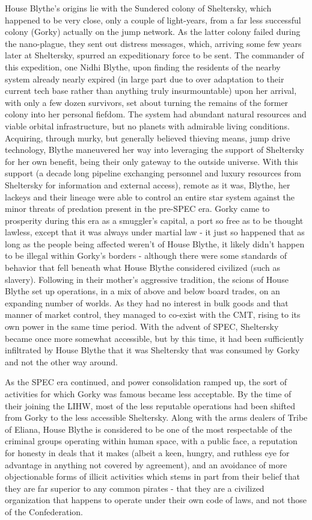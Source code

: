 \begin{itemize}
House Blythe's origins lie with the Sundered colony of Sheltersky,
which happened to be very close, only a couple of light-years, from a
far less successful colony (Gorky) actually on the jump network. As
the latter colony failed during the nano-plague, they sent out
distress messages, which, arriving some few years later at Sheltersky,
spurred an expeditionary force to be sent. The commander of this
expedition, one Nidhi Blythe, upon finding the residents of the nearby
system already nearly expired (in large part due to over adaptation to
their current tech base rather than anything truly insurmountable)
upon her arrival, with only a few dozen survivors, set about turning
the remains of the former colony into her personal fiefdom. The system
had abundant natural resources and viable orbital infrastructure, but
no planets with admirable living conditions. Acquiring, through murky,
but generally believed thieving means, jump drive technology, Blythe
maneuvered her way into leveraging the support of Sheltersky for her
own benefit, being their only gateway to the outside universe. With
this support (a decade long pipeline exchanging personnel and luxury
resources from Sheltersky for information and external access), remote
as it was, Blythe, her lackeys and their lineage were able to control
an entire star system against the minor threats of predation present
in the pre-SPEC era. Gorky came to prosperity during this era as a
smuggler's capital, a port so free as to be thought lawless, except
that it was always under martial law - it just so happened that as
long as the people being affected weren't of House Blythe, it likely
didn't happen to be illegal within Gorky's borders - although there
were some standards of behavior that fell beneath what House Blythe
considered civilized (such as slavery). Following in their mother's
aggressive tradition, the scions of House Blythe set up operations, in
a mix of above and below board trades, on an expanding number of
worlds. As they had no interest in bulk goods and that manner of
market control, they managed to co-exist with the CMT, rising to its
own power in the same time period. With the advent of SPEC, Sheltersky
became once more somewhat accessible, but by this time, it had been
sufficiently infiltrated by House Blythe that it was Sheltersky that
was consumed by Gorky and not the other way around.

As the SPEC era continued, and power consolidation ramped up, the sort
of activities for which Gorky was famous became less acceptable. By
the time of their joining the LIHW, most of the less reputable
operations had been shifted from Gorky to the less accessible
Sheltersky. Along with the arms dealers of Tribe of Eliana, House
Blythe is considered to be one of the most respectable of the criminal
groups operating within human space, with a public face, a reputation
for honesty in deals that it makes (albeit a keen, hungry, and
ruthless eye for advantage in anything not covered by agreement), and
an avoidance of more objectionable forms of illicit activities which
stems in part from their belief that they are far superior to any
common pirates - that they are a civilized organization that happens
to operate under their own code of laws, and not those of the
Confederation.


\end{itemize}
